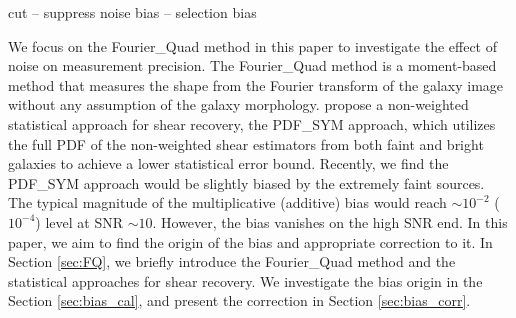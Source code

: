 \documentclass[twocolumn]{aastex62}
\begin{document}
cut -- suppress noise bias -- selection bias


We focus on the Fourier\_Quad method\citep{Zhang2008, Zhang2015} in this paper to investigate the effect of noise on measurement precision. The Fourier\_Quad method is a moment-based method that measures the shape from the Fourier transform of the galaxy image without any assumption of the galaxy morphology. \cite{Zhang2017} propose a non-weighted statistical approach for shear recovery, the PDF\_SYM approach, which utilizes the full PDF of the non-weighted shear estimators from both faint and bright galaxies to achieve a lower statistical error bound. Recently, we find the PDF\_SYM approach would be slightly biased by the extremely faint sources. The typical magnitude of the multiplicative (additive) bias would reach $\sim 10^{-2}$ ($10^{-4}$) level at SNR $\sim 10$. However, the bias vanishes on the high SNR end. In this paper, we aim to find the origin of the bias and appropriate correction to it. In Section \ref{sec:FQ}, we briefly introduce the Fourier\_Quad method and the statistical approaches for shear recovery. We investigate the bias origin in the Section \ref{sec:bias_cal}, and present the correction in Section \ref{sec:bias_corr}.



 
\end{document}
